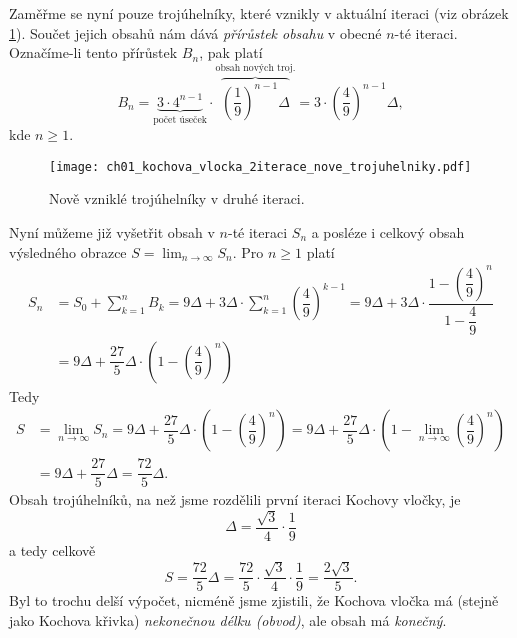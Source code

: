 Zaměřme se nyní pouze trojúhelníky, které vznikly v aktuální iteraci (viz obrázek \ref{fig:kochova_vlocka_2iterace_nove_trojuhelniky}). Součet jejich obsahů nám dává \emph{přírůstek obsahu} v obecné $n$-té iteraci. Označíme-li tento přírůstek $B_n$, pak platí
\[B_n=\underbrace{3\cdot 4^{n-1}}_{\text{počet úseček}}\cdot\overbrace{\left(\dfrac{1}{9}\right)^{n-1}\Delta}^{\text{obsah nových troj.}}=3\cdot\left(\dfrac{4}{9}\right)^{n-1}\Delta,\]
kde $n\geqslant 1$.
\begin{figure}[h]
    \centering
    \texttt{[image: ch01\_kochova\_vlocka\_2iterace\_nove\_trojuhelniky.pdf]}
    \caption{Nově vzniklé trojúhelníky v druhé iteraci.}
    \label{fig:kochova_vlocka_2iterace_nove_trojuhelniky}
\end{figure}
Nyní můžeme již vyšetřit obsah v $n$-té iteraci $S_n$ a posléze i celkový obsah výsledného obrazce $S=\lim_{n\to\infty}{S_n}$. Pro $n\geqslant 1$ platí
\begin{align*}
    S_n&=S_0+\sum_{k=1}^{n}{B_k}=9\Delta+3\Delta\cdot\sum_{k=1}^{n}{\left(\dfrac{4}{9}\right)^{k-1}}=9\Delta+3\Delta\cdot\dfrac{1-\left(\dfrac{4}{9}\right)^{n}}{1-\dfrac{4}{9}}\\
    &=9\Delta+\dfrac{27}{5}\Delta\cdot\left(1-\left(\dfrac{4}{9}\right)^n\right)
\end{align*}
Tedy
\begin{align*}
    S&=\lim_{n\to\infty}{S_n}=9\Delta+\dfrac{27}{5}\Delta\cdot\left(1-\left(\dfrac{4}{9}\right)^n\right)=9\Delta+\dfrac{27}{5}\Delta\cdot\left(1-\lim_{n\to\infty}\left(\dfrac{4}{9}\right)^n\right)\\
    &=9\Delta+\dfrac{27}{5}\Delta=\dfrac{72}{5}\Delta.
\end{align*}
Obsah trojúhelníků, na než jsme rozdělili první iteraci Kochovy vločky, je
\[\Delta=\dfrac{\sqrt{3}}{4}\cdot\dfrac{1}{9}\]
a tedy celkově
\[S=\dfrac{72}{5}\Delta=\dfrac{72}{5}\cdot\dfrac{\sqrt{3}}{4}\cdot\dfrac{1}{9}=\dfrac{2\sqrt{3}}{5}.\]
Byl to trochu delší výpočet, nicméně jsme zjistili, že Kochova vločka má (stejně jako Kochova křivka) \emph{nekonečnou délku (obvod)}, ale obsah má \emph{konečný}.
